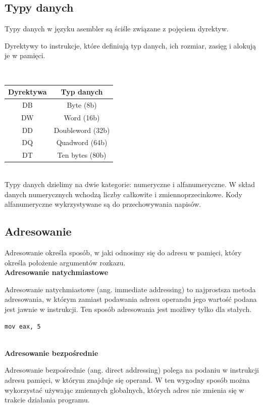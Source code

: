 \documentclass[a4paper,12pt,twoside]{article}
\begin{document}
\subsection{Typy danych}

Typy danych w języku asembler są ściśle związane z pojęciem dyrektyw.

Dyrektywy to instrukcje, które definiują typ danych, ich rozmiar, zasięg i alokują je w pamięci.

\\
\begin{center}
\begin{tabular}{|c|c|}
\hline 
Dyrektywa & Typ danych \\ 
\hline 
DB & Byte (8b) \\ 
\hline 
DW & Word (16b) \\ 
\hline 
DD & Doubleword (32b) \\ 
\hline 
DQ & Quadword (64b) \\ 
\hline 
DT & Ten bytes (80b) \\ 
\hline 
\end{tabular} 
\end{center}
\\

Typy danych dzielimy na dwie kategorie: numeryczne i alfanumeryczne. W skład danych numerycznych wchodzą liczby całkowite i zmiennoprzecinkowe. Kody alfanumeryczne wykrzystywane są do przechowywania napisów.

\subsection{Adresowanie}

Adresowanie określa sposób, w jaki odnosimy się do adresu w pamięci, który określa położenie argumentów rozkazu.
\\
\textbf{Adresowanie natychmiastowe}

Adresowanie natychmiastowe (ang. immediate addressing) to najprostsza metoda adresowania, w którym zamiast podawania adresu operandu jego wartość podana jest jawnie w instrukcji. Ten sposób adresowania jest możliwy tylko dla stałych.

\begin{lstlisting}[numbers=none, xleftmargin=0]
mov eax, 5
\end{lstlisting}
\\
\textbf{Adresowanie bezpośrednie}

Adresowanie bezpośrednie (ang. direct addressing) polega na podaniu w instrukcji adresu pamięci, w którym znajduje się operand. W ten wygodny sposób można wykorzystać używając zmiennych globalnych, których adres nie zmienia się w trakcie działania programu.
\end{document}
